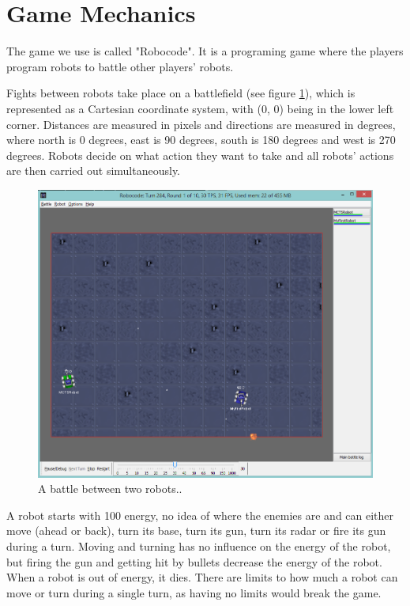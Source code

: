 \section{Game Mechanics}
\label{03}

The game we use is called "Robocode"\cite{robocode}. It is a programing game where the players program robots to battle other players' robots. 

Fights between robots take place on a battlefield (see figure \ref{figure-RobocodeBattle01}), which is represented as a Cartesian coordinate system, with (0, 0) being in the lower left corner. Distances are measured in pixels and directions are measured in degrees, where north is 0 degrees, east is 90 degrees, south is 180 degrees and west is 270 degrees. Robots decide on what action they want to take and all robots' actions are then carried out simultaneously.

\begin{figure}[htp]
\centerline{\includegraphics[width=\columnwidth]{Images/RobocodeBattle01}}
\caption{A battle between two robots..}
\label{figure-RobocodeBattle01}
\end{figure}

A robot starts with 100 energy, no idea of where the enemies are and can either move (ahead or back), turn its base, turn its gun, turn its radar or fire its gun during a turn. Moving and turning has no influence on the energy of the robot, but firing the gun and getting hit by bullets decrease the energy of the robot. When a robot is out of energy, it dies. There are limits to how much a robot can move or turn during a single turn\cite{wiki:robocodeGamePhysics}, as having no limits would break the game.

